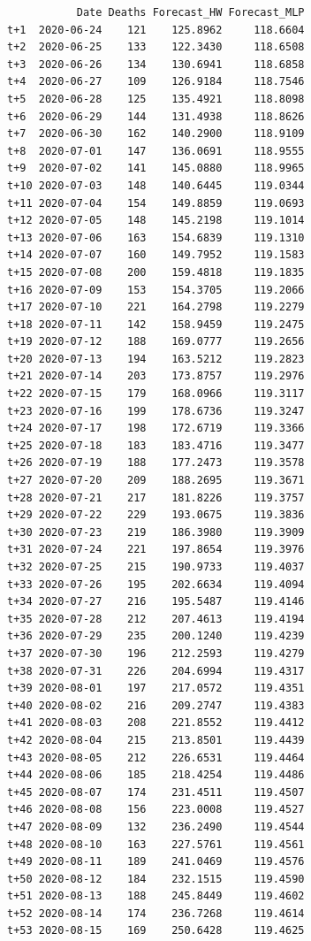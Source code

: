 \documentclass[
  us-letterpaper,
]{scrreprt}
\theoremstyle{plain}
\theoremstyle{definition}
\theoremstyle{definition}
\theoremstyle{plain}
\theoremstyle{remark}
\begin{document}
\begin{table}
{\begin{verbatim}
           Date Deaths Forecast_HW Forecast_MLP
t+1  2020-06-24    121    125.8962     118.6604
t+2  2020-06-25    133    122.3430     118.6508
t+3  2020-06-26    134    130.6941     118.6858
t+4  2020-06-27    109    126.9184     118.7546
t+5  2020-06-28    125    135.4921     118.8098
t+6  2020-06-29    144    131.4938     118.8626
t+7  2020-06-30    162    140.2900     118.9109
t+8  2020-07-01    147    136.0691     118.9555
t+9  2020-07-02    141    145.0880     118.9965
t+10 2020-07-03    148    140.6445     119.0344
t+11 2020-07-04    154    149.8859     119.0693
t+12 2020-07-05    148    145.2198     119.1014
t+13 2020-07-06    163    154.6839     119.1310
t+14 2020-07-07    160    149.7952     119.1583
t+15 2020-07-08    200    159.4818     119.1835
t+16 2020-07-09    153    154.3705     119.2066
t+17 2020-07-10    221    164.2798     119.2279
t+18 2020-07-11    142    158.9459     119.2475
t+19 2020-07-12    188    169.0777     119.2656
t+20 2020-07-13    194    163.5212     119.2823
t+21 2020-07-14    203    173.8757     119.2976
t+22 2020-07-15    179    168.0966     119.3117
t+23 2020-07-16    199    178.6736     119.3247
t+24 2020-07-17    198    172.6719     119.3366
t+25 2020-07-18    183    183.4716     119.3477
t+26 2020-07-19    188    177.2473     119.3578
t+27 2020-07-20    209    188.2695     119.3671
t+28 2020-07-21    217    181.8226     119.3757
t+29 2020-07-22    229    193.0675     119.3836
t+30 2020-07-23    219    186.3980     119.3909
t+31 2020-07-24    221    197.8654     119.3976
t+32 2020-07-25    215    190.9733     119.4037
t+33 2020-07-26    195    202.6634     119.4094
t+34 2020-07-27    216    195.5487     119.4146
t+35 2020-07-28    212    207.4613     119.4194
t+36 2020-07-29    235    200.1240     119.4239
t+37 2020-07-30    196    212.2593     119.4279
t+38 2020-07-31    226    204.6994     119.4317
t+39 2020-08-01    197    217.0572     119.4351
t+40 2020-08-02    216    209.2747     119.4383
t+41 2020-08-03    208    221.8552     119.4412
t+42 2020-08-04    215    213.8501     119.4439
t+43 2020-08-05    212    226.6531     119.4464
t+44 2020-08-06    185    218.4254     119.4486
t+45 2020-08-07    174    231.4511     119.4507
t+46 2020-08-08    156    223.0008     119.4527
t+47 2020-08-09    132    236.2490     119.4544
t+48 2020-08-10    163    227.5761     119.4561
t+49 2020-08-11    189    241.0469     119.4576
t+50 2020-08-12    184    232.1515     119.4590
t+51 2020-08-13    188    245.8449     119.4602
t+52 2020-08-14    174    236.7268     119.4614
t+53 2020-08-15    169    250.6428     119.4625
\end{verbatim}

}

\end{table}%
\end{document}
